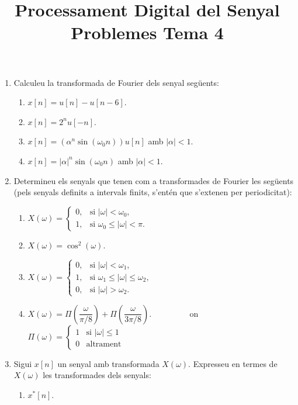 \documentclass[a4paper,12pt]{article}
\title{Processament Digital del Senyal \\ Problemes Tema 4}
\date{}
\begin{document}
\maketitle{}

\begin{enumerate}
\item Calculeu la transformada de Fourier dels senyal següents:
  \begin{enumerate}
  \item $x[n]=u[n]-u[n-6]$.
  \item $x[n]=2^nu[-n]$.
  \item $x[n]=(\alpha^n\sin(\omega_0n))u[n]$ amb $|\alpha|<1$.
  \item $x[n]=|\alpha|^n\sin(\omega_0n)$ amb $|\alpha|<1$.
  \end{enumerate}
\item Determineu els senyals que tenen com a transformades de Fourier
  les següents (pels senyals definits a intervals finits, s'entén que
  s'extenen per periodicitat):
  \begin{enumerate}
  \item $X(\omega)=\begin{cases}
      0,& \text{si $|\omega|<\omega_0$,}\\
      1,& \text{si $\omega_0 \leq |\omega|<\pi$.}
    \end{cases}$
  \item $X(\omega)=\cos^2(\omega)$.
  \item $X(\omega)=\begin{cases}
      0,& \text{si $|\omega|<\omega_1$,}\\
      1,& \text{si $\omega_1 \leq | \omega|\leq \omega_2$,}\\
      0,& \text{si $|\omega|>\omega_2$.}
    \end{cases}$
  \item
    $X(\omega)=\Pi\left(\dfrac\omega{\pi/8}\right)+
    \Pi\left(\dfrac\omega{3\pi/8}\right).$ $\qquad \qquad$ on $\qquad$
    $\Pi(\omega)=\begin{cases} 1 & \text{si } |\omega| \leq 1 \\ 0 & \text{altrament} \end{cases}$
  \end{enumerate}
\item Sigui $x[n]$ un senyal amb transformada $X(\omega)$. Expresseu
  en termes de $X(\omega)$ les transformades dels senyals:
  \begin{enumerate}
  \item $x^*[n]$.

\end{enumerate}
\end{enumerate}
\end{document}

